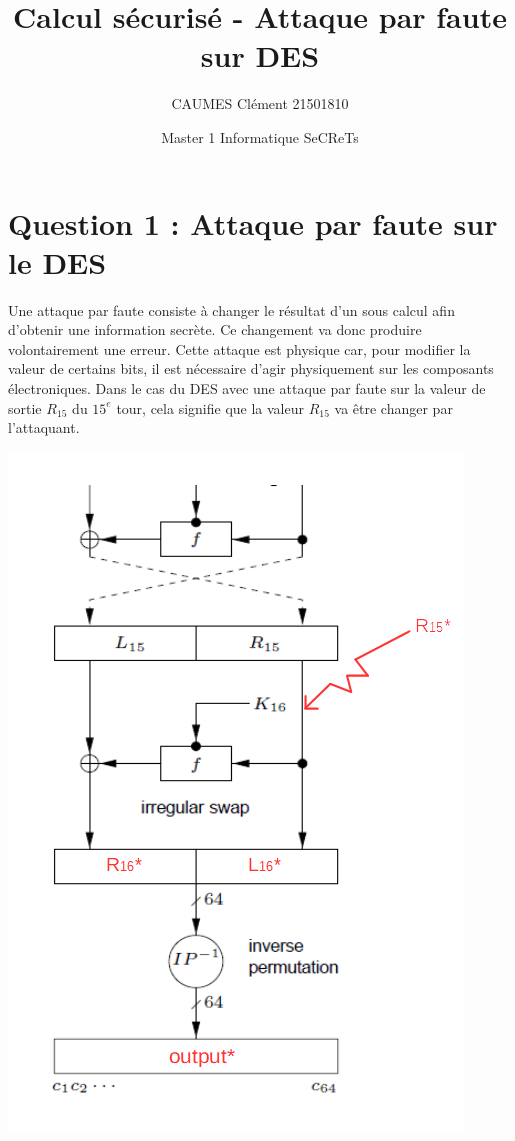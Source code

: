 \documentclass[11pt]{article}
\title{\huge{\textbf Calcul sécurisé - Attaque par faute sur DES}}
\author{CAUMES Clément 21501810}
\date{Master 1 Informatique SeCReTs}
\begin{document}
\maketitle
\vspace{20em}
\newpage

\tableofcontents
\newpage

\section{Question 1 : Attaque par faute sur le DES}

Une attaque par faute consiste à changer le résultat d'un sous calcul afin d'obtenir une information secrète. Ce changement va donc produire volontairement une erreur. Cette attaque est physique car, pour modifier la valeur de certains bits, il est nécessaire d'agir physiquement sur les composants électroniques. 
Dans le cas du DES avec une attaque par faute sur la valeur de sortie $R_{15}$ du $15^{e}$ tour, cela signifie que la valeur $R_{15}$ va être changer par l'attaquant. 

\begin{center}\includegraphics[scale=0.6]{../pictures/fauteR15.png}\end{center}
\end{document}
